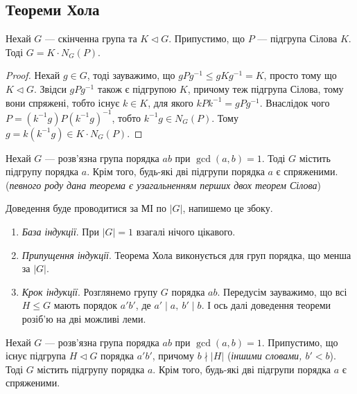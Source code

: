 \documentclass{math_library}
\begin{document}
\subsection{Теореми Хола}
\begin{theorem}
Нехай $G$ --- скінченна група та $K \triangleleft G$. Припустимо, що $P$ --- підгрупа Сілова $K$. Тоді $G = K \cdot N_G(P)$.
\end{theorem}

\begin{proof}
Нехай $g \in G$, тоді зауважимо, що $gPg^{-1} \leq gKg^{-1} = K$, просто тому що $K \triangleleft G$. Звідси $gPg^{-1}$ також є підгрупою $K$, причому теж підгрупа Сілова, тому вони спряжені, тобто існує $k \in K$, для якого $kPk^{-1} = gPg^{-1}$. Внаслідок чого $P = (k^{-1}g)P(k^{-1}g)^{-1}$, тобто $k^{-1}g \in N_G(P)$. Тому $g = k(k^{-1}g) \in K \cdot N_G(P)$.
\end{proof}

\begin{theorem}
Нехай $G$ --- розв'язна група порядка $ab$ при $\gcd(a,b) = 1$. Тоді $G$ містить підгрупу порядка $a$. Крім того, будь-які дві підгрупи порядка $a$ є спряженими.\\
(\textit{певного роду дана теорема є узагальненням перших двох теорем Сілова})
\end{theorem}

Доведення буде проводитися за МІ по $|G|$, напишемо це збоку.
\begin{enumerate}[nosep,wide=0pt,label={\Roman*.}]
\item \textit{База індукції}. При $|G| = 1$ взагалі нічого цікавого.
\item \textit{Припущення індукції}. Теорема Хола виконується для груп порядка, що менша за $|G|$.
\item \textit{Крок індукції}. Розглянемо групу $G$ порядка $ab$. Передусім зауважимо, що всі $H \leq G$ мають порядок $a'b'$, де $a' \mid a,\ b' \mid b$. І ось далі доведення теореми розіб'ю на дві можливі леми.
\end{enumerate}

\begin{lemma}
Нехай $G$ --- розв'язна група порядка $ab$ при $\gcd(a,b) = 1$. Припустимо, що існує підгрупа $H \triangleleft G$ порядка $a'b'$, причому $b \nmid |H|$ (\textit{іншими словами, $b' < b$}). Тоді $G$ містить підгрупу порядка $a$. Крім того, будь-які дві підгрупи порядка $a$ є спряженими.
\end{lemma}
\end{document}
